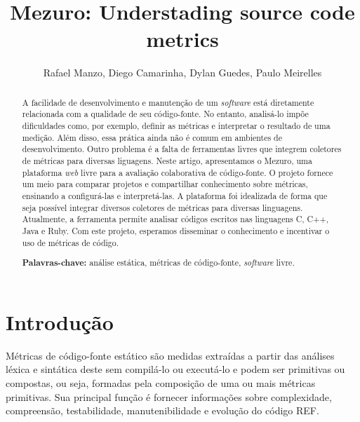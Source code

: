 \documentclass{llncs}
\begin{document}
\sloppy
\title{Mezuro: Understading source code metrics}

\author{Rafael Manzo, Diego Camarinha,
        Dylan Guedes, Paulo Meirelles}


\maketitle
\begin{abstract}
  A facilidade de desenvolvimento e manutenção de um \textit{software} está
diretamente relacionada com a qualidade de seu código-fonte.
  No entanto, analisá-lo impõe dificuldades como, por exemplo, definir as
métricas e interpretar o resultado de uma medição. Além disso, essa prática
ainda não é comum em ambientes de desenvolvimento. Outro problema é a falta de
ferramentas livres que integrem coletores de métricas para diversas liguagens.
  Neste artigo, apresentamos o Mezuro, uma plataforma \textit{web} livre para a
avaliação colaborativa de código-fonte. O projeto fornece um meio para comparar
projetos e compartilhar conhecimento sobre métricas, ensinando a configurá-las
e interpretá-las. A plataforma foi idealizada de forma que seja possível
integrar diversos coletores de métricas para diversas linguagens. Atualmente, a
ferramenta permite analisar códigos escritos nas linguagens C, C++, Java e
Ruby.
  Com este projeto, esperamos disseminar o conhecimento e incentivar o uso de
métricas de código.

\textbf{Palavras-chave:} análise estática, métricas de código-fonte,
\textit{software} livre.
\end{abstract}


\section{Introdução} \label{sec:intro}
Métricas de código-fonte estático são medidas extraídas a partir das análises
léxica e sintática deste sem compilá-lo ou executá-lo e podem ser primitivas ou
compostas, ou seja, formadas pela composição de uma ou mais métricas
primitivas. Sua principal função é fornecer informações sobre complexidade,
compreensão, testabilidade, manutenibilidade e evolução do
código REF.
\end{document}
